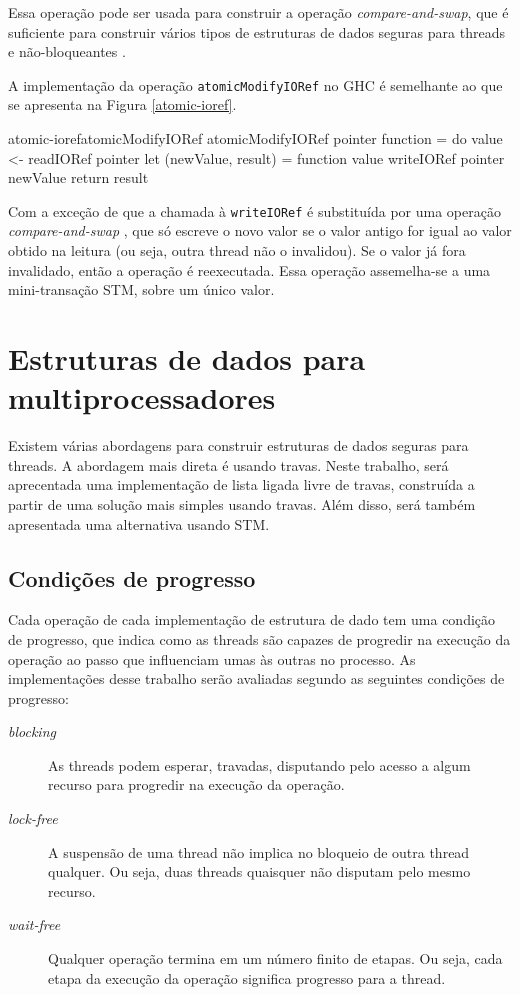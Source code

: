 \documentclass[a4paper,12pt,oldfontcommands]{abntex2}
\begin{document}
Essa operação pode ser usada para construir a operação \textit{compare-and-swap}, que é suficiente para construir vários tipos de estruturas de dados seguras para threads e não-bloqueantes \cite{valois1995lock}.

A implementação da operação \texttt{atomicModifyIORef} no GHC é semelhante ao que se apresenta na Figura \ref{atomic-ioref}.

\begin{code}{atomic-ioref}{atomicModifyIORef}
atomicModifyIORef pointer function = do
    value <- readIORef pointer
    let (newValue, result) = function value
    writeIORef pointer newValue
    return result
\end{code}

Com a exceção de que a chamada à \texttt{writeIORef} é substituída por uma operação \textit{compare-and-swap} \cite{sulzmann2009comparing}, que só escreve o novo valor se o valor antigo for igual ao valor obtido na leitura (ou seja, outra thread não o invalidou). Se o valor já fora invalidado, então a operação é reexecutada. Essa operação assemelha-se a uma mini-transação STM, sobre um único valor.

\chapter{Estruturas de dados para multiprocessadores}\label{chapter-data-structures}

Existem várias abordagens para construir estruturas de dados seguras para threads. A abordagem mais direta é usando travas. Neste trabalho, será aprecentada uma implementação de lista ligada livre de travas, construída a partir de uma solução mais simples usando travas. Além disso, será também apresentada uma alternativa usando STM.

\section{Condições de progresso}

Cada operação de cada implementação de estrutura de dado tem uma condição de progresso, que indica como as threads são capazes de progredir na execução da operação ao passo que influenciam umas às outras no processo. As implementações desse trabalho serão avaliadas segundo as seguintes condições de progresso:

\begin{description}
\item [\textit{blocking}] As threads podem esperar, travadas, disputando pelo acesso a algum recurso para progredir na execução da operação.
\item [\textit{lock-free}] A suspensão de uma thread não implica no bloqueio de outra thread qualquer. Ou seja, duas threads quaisquer não disputam pelo mesmo recurso.
\item [\textit{wait-free}] Qualquer operação termina em um número finito de etapas. Ou seja, cada etapa da execução da operação significa progresso para a thread.
\end{description}
\end{document}

